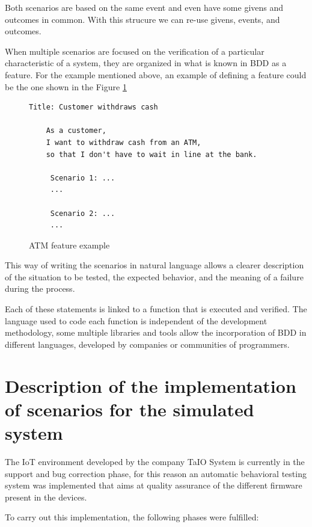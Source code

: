 \documentclass[journal]{IEEEtran}	%
\begin{document}
Both scenarios are based on the same event and even have some givens and outcomes in common. With this strucure we can re-use givens, events, and outcomes.

When multiple scenarios are focused on the verification of a particular characteristic of a system, they are organized in what is known in BDD as a feature. For the example mentioned above, an example of defining a feature could be the one shown in the Figure \ref{fig:ATMfeature}

\begin{figure}[H]
\centering
\begin{lstlisting}[]
   Title: Customer withdraws cash
    
    As a customer,
    I want to withdraw cash from an ATM,
    so that I don't have to wait in line at the bank.
    
     Scenario 1: ...
     ...
    
     Scenario 2: ...
     ...
\end{lstlisting}
\caption{ATM feature example}
\label{fig:ATMfeature}
\end{figure}



This way of writing the scenarios in natural language allows a clearer description of the situation to be tested, the expected behavior, and the meaning of a failure during the process.

Each of these statements is linked to a function that is executed and verified. The language used to code each function is independent of the development methodology, some multiple libraries and tools allow the incorporation of BDD in different languages, developed by companies or communities of programmers.


\section{Description of the implementation of scenarios for the simulated system}

The IoT environment developed by the company TaIO System is currently in the support and bug correction phase, for this reason an automatic behavioral testing system was implemented that aims at quality assurance of the different firmware present in the devices.

To carry out this implementation, the following phases were fulfilled:
\end{document}
